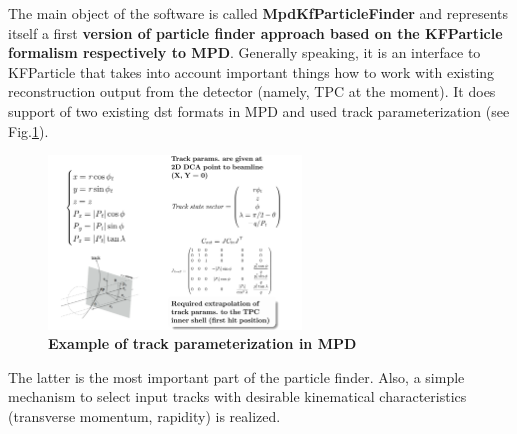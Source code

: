 \documentclass[8pt,a5paper, oldfontcommands]{memoir}
\begin{document}
The main object of the software is called {\bf MpdKfParticleFinder} and represents itself a first {\bf version of particle finder approach based on the KFParticle formalism respectively to MPD}.
Generally speaking, it is an interface to KFParticle that takes into account important things how to work with existing reconstruction output from the detector (namely, TPC at the moment).
It does support of two existing dst formats in MPD and used track parameterization (see Fig.\ref{fig1}).
\begin{figure}[H]
  \centering
  \includegraphics[width=0.6\textwidth]{img/trackParams.png}
  \caption{\bf Example of track parameterization in MPD}
  \label{fig1}
\end{figure}

The latter is the most important part of the particle finder.
Also, a simple mechanism to select input tracks with desirable kinematical characteristics (transverse momentum, rapidity) is realized.
\end{document}
